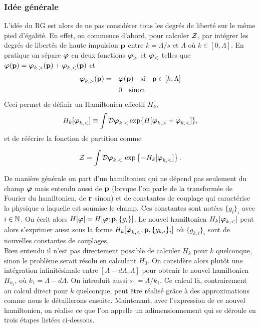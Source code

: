 \documentclass[10pt]{article}
\begin{document}
\begin{multicols}{2}
\subsubsection{Idée générale}

L'idée du RG est alors de ne pas considérer tous les degrés de liberté sur le même pied d'égalité. En effet, on commence d'abord, pour calculer $\mathcal{Z}$, par intégrer les degrés de libertés de haute impulsion ${\bf p}$ entre $k = \Lambda/s$ et $\Lambda$ où $k \in [0,\Lambda]$. En pratique on sépare $\boldsymbol{ \varphi}$ en deux fonctions $\boldsymbol{ \varphi}_>$ et $\boldsymbol{ \varphi}_<$ telles que $\boldsymbol{ \varphi}({\bf p}) = \boldsymbol{ \varphi}_{k,>}({\bf p}) + \boldsymbol{ \varphi}_{k,<}({\bf p})$ et
\begin{align}
	\boldsymbol{ \varphi}_{k,>}({\bf p})  = \quad & \boldsymbol{ \varphi}({\bf p}) \quad \text{si} \quad {\bf p} \in   [k,\Lambda] \\
	 & 0 \quad \text{sinon}
\end{align}
Ceci permet de définir un Hamiltonien effectif $H_k$, 
\begin{equation}
	H_k[\boldsymbol{ \varphi}_{k,<}] \equiv \int \mathcal{D} \boldsymbol{ \varphi}_{k,<}  \exp \{ H[\boldsymbol{ \varphi}_{k,>}+ \boldsymbol{ \varphi}_{k,<}] \},
\end{equation}
et de réécrire la fonction de partition comme 

\begin{equation}
\mathcal{Z} = \int \mathcal{D} \boldsymbol{ \varphi}_{k,<} \, \exp\left\{- H_k[\boldsymbol{ \varphi}_{k,<}]\right\}. 
\end{equation} 

De manière générale on part d'un hamiltonien qui ne dépend pas seulement du champ $\boldsymbol{ \varphi}$ mais entendu aussi  de ${\bf p}$ (lorsque l'on parle de la transformée de Fourier du hamiltonien, de ${\bf r}$ sinon) et de constantes de couplage qui caractérise la physique a laquelle est soumise le champ. Ces constantes sont notées $\{g_i\}_i$ avec $i \in \mathbb{N}$. On écrit alors $H[\boldsymbol{ \varphi}] = H[\boldsymbol{ \varphi} ; {\bf p}, \{g_i\}]$. Le nouvel hamiltonien $H_k[\boldsymbol{ \varphi}_{k,<}]$ peut alors s'exprimer aussi sous la forme $H_k[\boldsymbol{ \varphi}_{k,<} ; {\bf p}, \{g_{k,i}\}_i]$ où $\{g_{k,i}\}_i$ sont de nouvelles constantes de couplages. \\

Bien entendu il n'est pas directement possible de calculer $H_k$ pour $k$ quelconque, sinon le problème serait résolu en calculant $H_0$. On considère alors plutôt une intégration infinitésimale entre $[\Lambda - d\Lambda, \Lambda]$ pour obtenir le nouvel hamiltonien $H_{k_1}$, où $k_1 = \Lambda - d\Lambda$. On introduit aussi $s_1 = \Lambda/k_1$. Ce calcul là, contrairement au calcul direct pour $k$ quelconque, peut être réalisé grâce à des approximations comme nous le détaillerons ensuite. Maintenant, avec l'expression de ce nouvel hamiltonien, on réalise ce que l'on appelle un adimensionnement qui se déroule en trois étapes listées ci-dessous.


\end{multicols}
\end{document}
